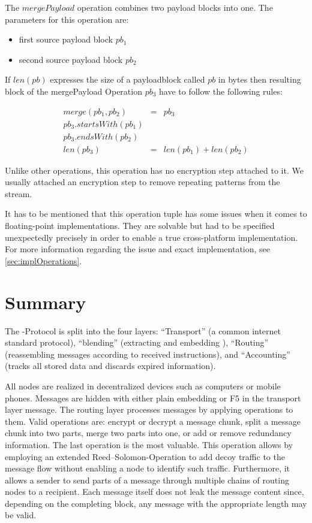 The $mergePayload$ operation combines two payload blocks into one. The parameters for this operation are:

\begin{itemize}
	\item first source payload block $pb_1$
	\item second source payload block $pb_2$
\end{itemize}

If $len(pb)$ expresses the size of a payloadblock called $pb$ in bytes then resulting block of the mergePayload Operation $pb_3$ have to follow the following rules:

\begin{eqnarray}
	merge(pb_1, pb_2) & = & pb_3 \\
	pb_3.startsWith(pb_1)\\
	pb_3.endsWith(pb_2)\\
	len(pb_3) & = & len(pb_1) + len(pb_2)
\end{eqnarray}

Unlike other operations, this operation has no encryption step attached to it. We usually attached an encryption step to remove repeating patterns from the \VortexMessage{} stream.

It has to be mentioned that this operation tuple has some issues when it comes to floating-point implementations. They are solvable but had to be specified unexpectedly precisely in order to enable a true cross-platform implementation. For more information regarding the issue and exact implementation, see \cref{sec:implOperations}.


\section{Summary}
The \MessageVortex{}-Protocol is split into the four layers: ``Transport'' (a common internet standard protocol), ``blending'' (extracting and embedding \VortexMessages), ``Routing'' (reassembling messages according to received instructions), and ``Accounting'' (tracks all stored data and discards expired information).

All nodes are realized in decentralized devices such as computers or mobile phones. Messages are hidden with either plain embedding or F5 in the transport layer message. The routing layer processes messages by applying operations to them. Valid operations are: encrypt or decrypt a message chunk, split a message chunk into two parts, merge two parts into one, or add or remove redundancy information. The last operation is the most valuable. This operation allows by employing an extended Reed--Solomon-Operation to add decoy traffic to the message flow without enabling a node to identify such traffic. Furthermore, it allows a sender to send parts of a message through multiple chains of routing nodes to a recipient. Each message itself does not leak the message content since, depending on the completing block, any message with the appropriate length may be valid.

